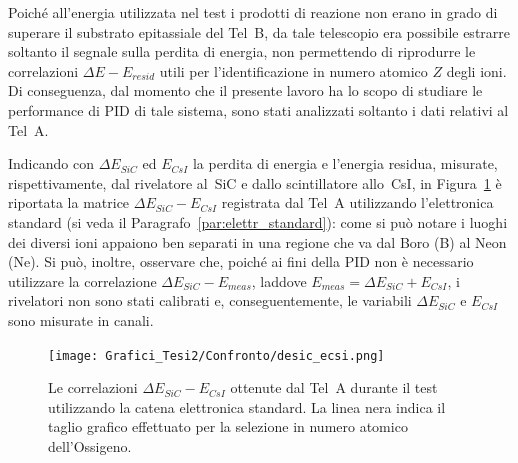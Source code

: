 Poiché all'energia utilizzata nel test i prodotti di reazione non erano in grado di superare il substrato epitassiale del Tel~B, da tale telescopio era possibile estrarre soltanto il segnale sulla perdita di energia, non permettendo di riprodurre le correlazioni $\Delta E - E_{resid}$ utili per l'identificazione in numero atomico $Z$ degli ioni.
Di conseguenza, dal momento che il presente lavoro ha lo scopo di studiare le performance di PID di tale sistema, sono stati analizzati soltanto i dati relativi al Tel~A.



Indicando con $\Delta E_{SiC}$ ed $E_{CsI}$ la perdita di energia e l'energia residua, misurate, rispettivamente, dal rivelatore al~SiC e dallo scintillatore allo~CsI, in Figura~\ref{fig:sic_csi_standard} è riportata la matrice $\Delta E_{SiC} - E_{CsI}$ registrata dal Tel~A utilizzando l'elettronica standard (si veda il Paragrafo~\ref{par:elettr_standard}): come si può notare i luoghi dei diversi ioni appaiono ben separati in una regione che va dal Boro (B) al Neon (Ne).
Si può, inoltre, osservare che, poiché ai fini della PID non è necessario utilizzare la correlazione $\Delta E_{SiC} - E_{meas}$, laddove $E_{meas} = \Delta E_{SiC} + E_{CsI}$, i rivelatori non sono stati calibrati e, conseguentemente, le variabili $\Delta E_{SiC}$ e $E_{CsI}$ sono misurate in canali.


\begin{figure} [!p]
	\centering
	\texttt{[image: Grafici\_Tesi2/Confronto/desic\_ecsi.png]}
	\caption{Le correlazioni $\Delta E_{SiC} - E_{CsI}$ ottenute dal Tel~A durante il test utilizzando la catena elettronica standard. La linea nera indica il taglio grafico effettuato per la selezione in numero atomico dell'Ossigeno.} \label{fig:sic_csi_standard}
\end{figure}





